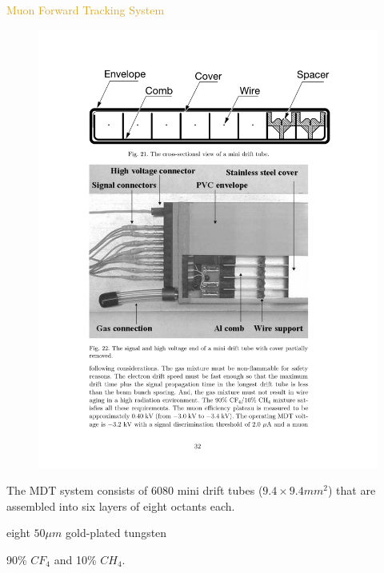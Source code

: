 \begin{frame}{\textcolor{Goldenrod}{Muon Forward Tracking System}}
  \begin{overlayarea}{\textwidth}{\textheight}
    \begin{figure}[h]
      \centering
      \includegraphics[height=0.4\textheight]{./Images/45_MD_miniPDT_02.pdf}
    \end{figure}
    \itt
  \item The MDT system consists of 6080 mini drift tubes ($9.4 \times
    9.4 mm^2$) that are assembled into six layers of eight octants each.
  \item {} eight $50 \mu m$ gold-plated tungsten
  \item {} 90\% $CF_4$ and 10\% $CH_4$.
    \tti
  \end{overlayarea}
\end{frame}

